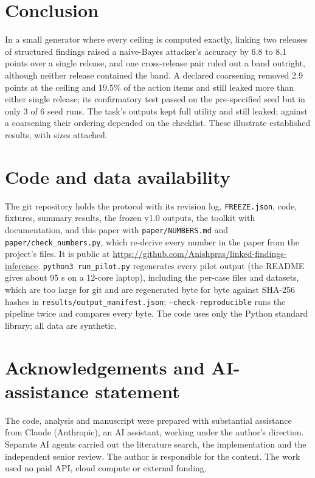 \documentclass[11pt]{article}
\newcommand{\code}[1]{\texttt{#1}}
\begin{document}
\section{Conclusion}

In a small generator where every ceiling is computed exactly, linking two releases of structured findings raised a naive-Bayes attacker's accuracy by 6.8 to 8.1 points over a single release, and one cross-release pair ruled out a band outright, although neither release contained the band. A declared coarsening removed 2.9 points at the ceiling and 19.5\% of the action items and still leaked more than either single release; its confirmatory test passed on the pre-specified seed but in only 3 of 6 seed runs. The task's outputs kept full utility and still leaked; against a coarsening their ordering depended on the checklist. These illustrate established results, with sizes attached.

\section*{Code and data availability}

The git repository holds the protocol with its revision log, \code{FREEZE.json}, code, fixtures, summary results, the frozen v1.0 outputs, the toolkit with documentation, and this paper with \code{paper/NUMBERS.md} and \code{paper/check\_numbers.py}, which re-derive every number in the paper from the project's files. It is public at \url{https://github.com/Anishpras/linked-findings-inference}. \code{python3 run\_pilot.py} regenerates every pilot output (the README gives about 95 s on a 12-core laptop), including the per-case files and datasets, which are too large for git and are regenerated byte for byte against SHA-256 hashes in \code{results/output\_manifest.json}; \code{--check-reproducible} runs the pipeline twice and compares every byte. The code uses only the Python standard library; all data are synthetic.

\section*{Acknowledgements and AI-assistance statement}

The code, analysis and manuscript were prepared with substantial assistance from Claude (Anthropic), an AI assistant, working under the author's direction. Separate AI agents carried out the literature search, the implementation and the independent senior review. The author is responsible for the content. The work used no paid API, cloud compute or external funding.
\end{document}
